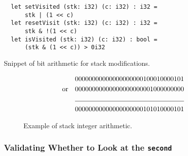 \begin{listing}[H]
\begin{verbatim}
  let setVisited (stk: i32) (c: i32) : i32 =
      stk | (1 << c)
  let resetVisit (stk: i32) (c: i32) : i32 =
      stk & !(1 << c)
  let isVisited (stk: i32) (c: i32) : bool =
      (stk & (1 << c)) > 0i32
\end{verbatim}
\caption{Snippet of bit arithmetic for stack modifications.}
\label{lst:stack}
\end{listing}

\begin{figure}\label{fig:bits}
\begin{align*}
	&& &00000000000000000000100010000101 &\\ \text{or} 
	&& &00000000000000000000001000000000 &\\ 
	\cline{3-4}
	&& &00000000000000000000101010000101
\end{align*}
\caption{Example of stack integer arithmetic.}
\end{figure}













\subsubsection{Validating Whether to Look at the \texttt{second}}

